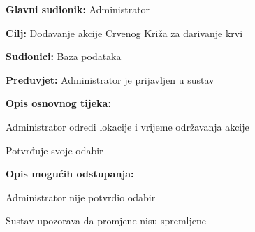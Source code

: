 				
				\noindent {}
				\begin{packed_item}
					
					\item \textbf{Glavni sudionik: }Administrator
					\item  \textbf{Cilj:} Dodavanje akcije Crvenog Križa za darivanje krvi
					\item  \textbf{Sudionici:} Baza podataka
					\item  \textbf{Preduvjet:} Administrator je prijavljen u sustav
					\item  \textbf{Opis osnovnog tijeka:}
					
					\item[] \begin{packed_enum}
						
						\item Administrator odredi lokacije i vrijeme održavanja akcije
						\item Potvrđuje svoje odabir
						
					\end{packed_enum}
					
					\item  \textbf{Opis mogućih odstupanja:}
					
					\item[] \begin{packed_item}
						
						\item[2.a] Administrator nije potvrdio odabir
						\item[] \begin{packed_enum}
							
							\item Sustav upozorava da promjene nisu spremljene
							
						\end{packed_enum}		
						
					\end{packed_item}
				\end{packed_item}
					
					
					
